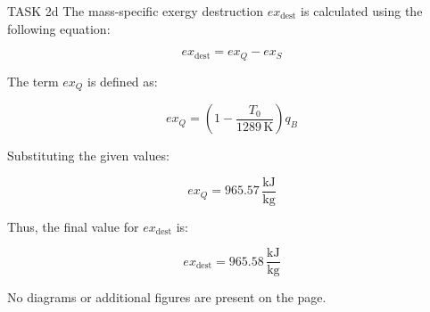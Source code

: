 TASK 2d  
The mass-specific exergy destruction \( ex_{\text{dest}} \) is calculated using the following equation:  

\[
ex_{\text{dest}} = ex_Q - ex_S
\]

The term \( ex_Q \) is defined as:  

\[
ex_Q = \left( 1 - \frac{T_0}{1289 \, \text{K}} \right) q_B
\]

Substituting the given values:  

\[
ex_Q = 965.57 \, \frac{\text{kJ}}{\text{kg}}
\]

Thus, the final value for \( ex_{\text{dest}} \) is:  

\[
ex_{\text{dest}} = 965.58 \, \frac{\text{kJ}}{\text{kg}}
\]  

No diagrams or additional figures are present on the page.